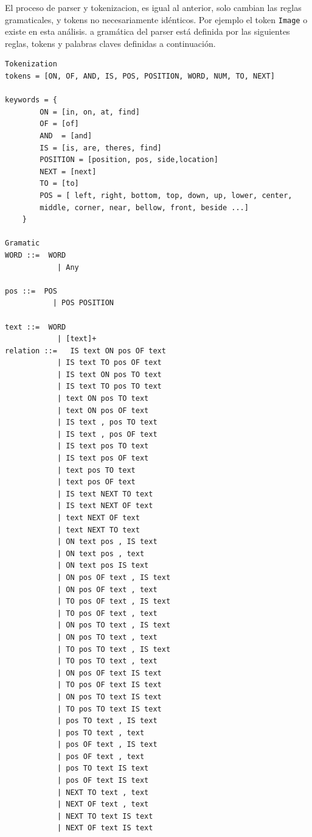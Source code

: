 El proceso de parser y tokenizacion, es igual al anterior, solo cambian las reglas gramaticales, y tokens no necesariamente id\'enticos. Por ejemplo el token \verb|Image| o existe en esta an\'alisis. a gram\'atica del parser est\'a definida por las siguientes reglas, tokens y palabras claves definidas a continuaci\'on.
\begin{verbatim}
Tokenization
tokens = [ON, OF, AND, IS, POS, POSITION, WORD, NUM, TO, NEXT]

keywords = {
        ON = [in, on, at, find]
        OF = [of]
        AND  = [and]
        IS = [is, are, theres, find]
        POSITION = [position, pos, side,location]
        NEXT = [next]
        TO = [to]
        POS = [ left, right, bottom, top, down, up, lower, center,
        middle, corner, near, bellow, front, beside ...]
    }

Gramatic    
WORD ::=  WORD
            | Any
    
pos ::=  POS
           | POS POSITION 

text ::=  WORD
            | [text]+
relation ::=   IS text ON pos OF text
            | IS text TO pos OF text
            | IS text ON pos TO text
            | IS text TO pos TO text
            | text ON pos TO text
            | text ON pos OF text
            | IS text , pos TO text
            | IS text , pos OF text
            | IS text pos TO text
            | IS text pos OF text
            | text pos TO text
            | text pos OF text
            | IS text NEXT TO text
            | IS text NEXT OF text
            | text NEXT OF text
            | text NEXT TO text
            | ON text pos , IS text
            | ON text pos , text
            | ON text pos IS text
            | ON pos OF text , IS text
            | ON pos OF text , text
            | TO pos OF text , IS text
            | TO pos OF text , text
            | ON pos TO text , IS text
            | ON pos TO text , text
            | TO pos TO text , IS text
            | TO pos TO text , text
            | ON pos OF text IS text
            | TO pos OF text IS text
            | ON pos TO text IS text
            | TO pos TO text IS text
            | pos TO text , IS text
            | pos TO text , text
            | pos OF text , IS text
            | pos OF text , text
            | pos TO text IS text
            | pos OF text IS text
            | NEXT TO text , text
            | NEXT OF text , text
            | NEXT TO text IS text
            | NEXT OF text IS text
\end{verbatim}

